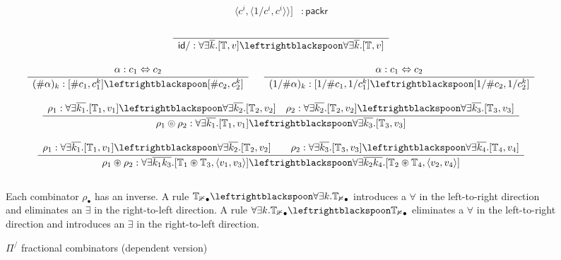 \documentclass[a4paper,USenglish]{lipics-v2016-utf8x}
\newcommand{\hash}{\#}
\newcommand{\isotwo}{\Leftrightarrow}
\newcommand{\order}[1]{\hash #1}
\newcommand{\iorder}[1]{1/\hash #1}
\newcommand{\Rule}[4]{
\makebox{{\rm #1}
$\displaystyle
\frac{\begin{array}{l}#2\\\end{array}}
{\begin{array}{l}#3\\\end{array}}$
 #4}}
\newcommand{\jdg}[3]{{#1} #3}
\newcommand{\packr}{\mathsf{{packr}}}
\newcommand{\idiso}{\mathsf{{id}}}
\begin{document}
\begin{figure}[t]
{\[\begin{array}{rrcll}
   \langle c^i, \langle 1/c^i, c^i \rangle \rangle]
  & : \packr
\end{array}\]
\[\begin{array}{c}
\Rule{}
{}
{\jdg{}{}{\idiso/ : \forall\exists{\overline{k}}.[\mathbb{T},v] \leftrightblackspoon
   \forall\exists{\overline{k}}.[\mathbb{T},v]}}
{}
\\
\\
\Rule{}
{\jdg{}{}{\alpha : c_1 \isotwo c_2}}
{\jdg{}{}{(\order{\alpha})_k :
 [\order{c_1},c_1^k]  \leftrightblackspoon
 [\order{c_2},c_2^k]}}
{}
~~
\Rule{}
{\jdg{}{}{\alpha : c_1 \isotwo c_2}}
{\jdg{}{}{(\iorder{\alpha})_k :
 [\iorder{c_1},1/c_1^k]  \leftrightblackspoon
 [\iorder{c_2},1/c_2^k]}}
{}
\\
\\
\Rule{}
{\jdg{}{}{\rho_1 :
  \forall\exists{\overline{k_1}}.[\mathbb{T}_1,v_1] \leftrightblackspoon
  \forall\exists{\overline{k_2}}.[\mathbb{T}_2,v_2]} \quad
  \rho_2 :
  \forall\exists{\overline{k_2}}.[\mathbb{T}_2,v_2] \leftrightblackspoon
  \forall\exists{\overline{k_3}}.[\mathbb{T}_3,v_3]}
{\jdg{}{}{\rho_1 \circledcirc \rho_2 :
 \forall\exists{\overline{k_1}}.[\mathbb{T}_1,v_1] \leftrightblackspoon
 \forall\exists{\overline{k_3}}.[\mathbb{T}_3},v_3]}
{}
\\
\\
\Rule{}
{\jdg{}{}{\rho_1 :
 \forall\exists{\overline{k_1}}.[\mathbb{T}_1,v_1] \leftrightblackspoon
 \forall\exists{\overline{k_2}}.[\mathbb{T}_2,v_2]}
 \qquad \rho_2 :
 \forall\exists{\overline{k_3}}.[\mathbb{T}_3,v_3] \leftrightblackspoon
 \forall\exists{\overline{k_4}}.[\mathbb{T}_4,v_4]}
{\jdg{}{}{\rho_1 \circledast \rho_2 :
  \forall\exists{\overline{k_1k_3}}.[\mathbb{T}_1 \circledast \mathbb{T}_3, \langle v_1,v_3 \rangle]
  \leftrightblackspoon
  \forall\exists{\overline{k_2k_4}}.[\mathbb{T}_2 \circledast \mathbb{T}_4}, \langle v_2,v_4 \rangle]}
{}
\end{array}\]
\\
Each combinator $\rho_\bullet$ has an inverse. A rule $\mathbb{T_1}_\bullet \leftrightblackspoon
\forall\exists{k}.\mathbb{T_2}_\bullet$ introduces a $\forall$ in the left-to-right
direction and eliminates an $\exists$ in the right-to-left direction. A rule
$\forall\exists{k}.\mathbb{T_1}_\bullet \leftrightblackspoon
\mathbb{T_2}_\bullet$ eliminates a $\forall$ in the left-to-right direction and
introduces an $\exists$ in the right-to-left direction.
}
\caption{$\Pi^/$ fractional combinators (dependent version)}
\label{pifracd:comb}
\end{figure}
\end{document}
